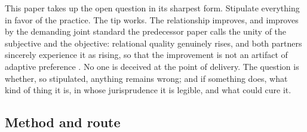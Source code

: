 \documentclass[11pt,a4paper]{article}
\begin{document}
This paper takes up the open question in its sharpest form. Stipulate everything in favor of the practice. The tip works. The relationship improves, and improves by the demanding joint standard the predecessor paper calls the unity of the subjective and the objective: relational quality genuinely rises, and both partners sincerely experience it as rising, so that the improvement is not an artifact of adaptive preference \parencite{sen1999development,nussbaum2000women}. No one is deceived at the point of delivery. The question is whether, so stipulated, anything remains wrong; and if something does, what kind of thing it is, in whose jurisprudence it is legible, and what could cure it.

\subsection{Method and route}
\label{p02:sec:intro-method}
\end{document}
